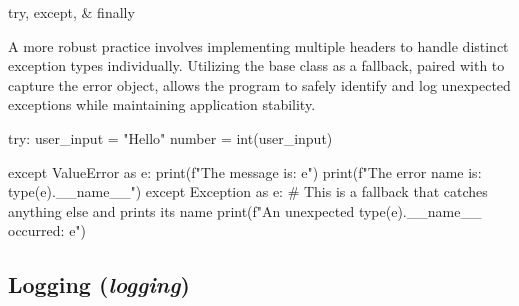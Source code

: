 \documentclass[10pt]{article}
\begin{document}
\begin{core}{try, except, \& finally}
\begin{pyconsole}
      \end{pyconsole}

      A more robust practice involves implementing multiple  headers to handle distinct exception types individually. Utilizing the base  class as a fallback, paired with  to capture the error object, allows the program to safely identify and log unexpected exceptions while maintaining application stability.

      \begin{pyconsole}

        try:
            user_input = "Hello"
            number = int(user_input)

        except ValueError as e:
            print(f"The message is: {e}")
            print(f"The error name is: {type(e).__name__}")
        except Exception as e: # This is a fallback that catches anything else and prints its name
            print(f"An unexpected {type(e).__name__} occurred: {e}")

      \end{pyconsole}

    \end{core}

  \subsection{Logging (\textit{logging})}
    \label{sec:logging}
    
\end{document}
